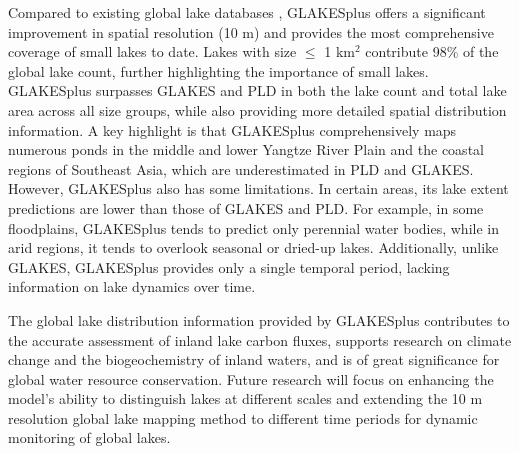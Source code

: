 \documentclass[preprint,12pt,authoryear]{elsarticle}
\begin{document}
Compared to existing global lake databases \citep{verpoorter_global_2014,messager_estimating_2016,sheng_representative_2016,pi_mapping_2022,wang_global_2022}, GLAKESplus offers a significant improvement in spatial resolution (10 m) and provides the most comprehensive coverage of small lakes to date. Lakes with size $\le$ 1 km$^2$ contribute 98\% of the global lake count, further highlighting the importance of small lakes. GLAKESplus surpasses GLAKES and PLD in both the lake count and total lake area across all size groups, while also providing more detailed spatial distribution information. A key highlight is that GLAKESplus comprehensively maps numerous ponds in the middle and lower Yangtze River Plain and the coastal regions of Southeast Asia, which are underestimated in PLD and GLAKES. However, GLAKESplus also has some limitations. In certain areas, its lake extent predictions are lower than those of GLAKES and PLD. For example, in some floodplains, GLAKESplus tends to predict only perennial water bodies, while in arid regions, it tends to overlook seasonal or dried-up lakes. Additionally, unlike GLAKES, GLAKESplus provides only a single temporal period, lacking information on lake dynamics over time.

The global lake distribution information provided by GLAKESplus contributes to the accurate assessment of inland lake carbon fluxes, supports research on climate change and the biogeochemistry of inland waters, and is of great significance for global water resource conservation. Future research will focus on enhancing the model's ability to distinguish lakes at different scales and extending the 10 m resolution global lake mapping method to different time periods for dynamic monitoring of global lakes. 




\end{document}
